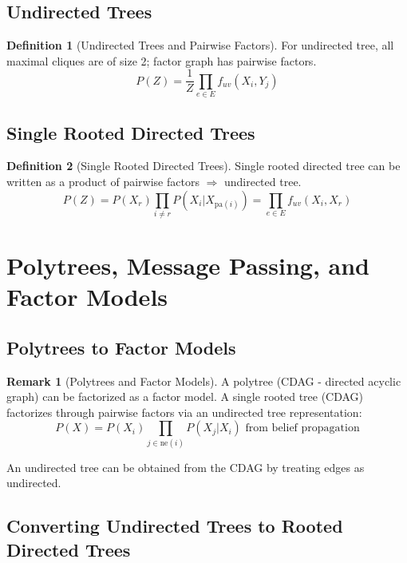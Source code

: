 \documentclass[12pt,a4paper]{article}
\theoremstyle{definition}
\newtheorem{definition}{Definition}[section]
\newtheorem{remark}{Remark}[section]
\begin{document}
\subsection{Undirected Trees}

\begin{definition}[Undirected Trees and Pairwise Factors]
For undirected tree, all maximal cliques are of size 2; factor graph has pairwise factors.
\[
P(Z) = \frac{1}{Z} \prod_{e \in E} f_{uv}(X_i, Y_j)
\]
\end{definition}

\subsection{Single Rooted Directed Trees}

\begin{definition}[Single Rooted Directed Trees]
Single rooted directed tree can be written as a product of pairwise factors $\Rightarrow$ undirected tree.
\[
P(Z) = P(X_r) \prod_{i \neq r} P(X_i | X_{\text{pa}(i)}) = \prod_{e \in E} f_{uv}(X_i, X_r)
\]
\end{definition}

\newpage

\section{Polytrees, Message Passing, and Factor Models}

\subsection{Polytrees to Factor Models}

\begin{remark}[Polytrees and Factor Models]
A polytree (CDAG - directed acyclic graph) can be factorized as a factor model. A single rooted tree (CDAG) factorizes through pairwise factors via an undirected tree representation:
\[
P(X) = P(X_i) \prod_{j \in \text{ne}(i)} P(X_j | X_i) \text{ from belief propagation}
\]

An undirected tree can be obtained from the CDAG by treating edges as undirected.
\end{remark}

\subsection{Converting Undirected Trees to Rooted Directed Trees}
\end{document}
